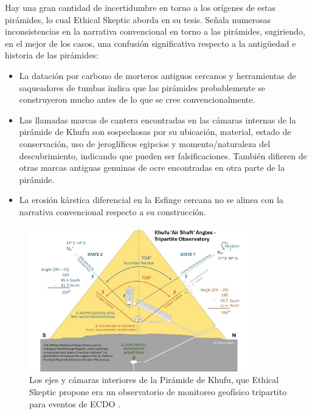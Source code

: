 \documentclass[10pt,twocolumn,letterpaper]{article}
\begin{document}
Hay una gran cantidad de incertidumbre en torno a los orígenes de estas pirámides, lo cual Ethical Skeptic aborda en su tesis. Señala numerosas inconsistencias en la narrativa convencional en torno a las pirámides, sugiriendo, en el mejor de los casos, una confusión significativa respecto a la antigüedad e historia de las pirámides:

\begin{flushleft}
\begin{itemize}
    \item La datación por carbono de morteros antiguos cercanos y herramientas de saqueadores de tumbas indica que las pirámides probablemente se construyeron mucho antes de lo que se cree convencionalmente.
    \item Las llamadas marcas de cantera encontradas en las cámaras internas de la pirámide de Khufu son sospechosas por su ubicación, material, estado de conservación, uso de jeroglíficos egipcios y momento/naturaleza del descubrimiento, indicando que pueden ser falsificaciones. También difieren de otras marcas antiguas genuinas de ocre encontradas en otra parte de la pirámide.
    \item La erosión kárstica diferencial en la Esfinge cercana no se alinea con la narrativa convencional respecto a su construcción.
\end{itemize}
\end{flushleft}

\begin{figure}[t]
\begin{center}
\includegraphics[width=0.85\textwidth]{shafts.jpg}
\end{center}
   \caption{Los ejes y cámaras interiores de la Pirámide de Khufu, que Ethical Skeptic propone era un observatorio de monitoreo geofísico tripartito para eventos de ECDO \cite{28}.}
\label{fig:5}
\end{figure}
\end{document}
